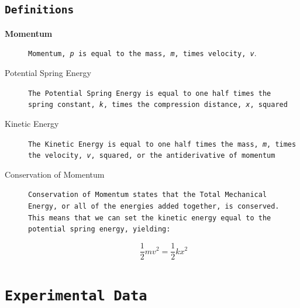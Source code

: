 \documentclass{article}
\begin{document}
\subsection{\texttt{Definitions}}
\label{definitions}
\begin{description}
\item[\textbf{Momentum}]
\texttt{Momentum, \textit{p} is equal to the mass, \textit{m}, times velocity, \textit{v}}.



\item[Potential Spring Energy]
\texttt{The Potential Spring Energy is equal to one half times the spring constant, \textit{k}, times the compression distance, \textit{x}, squared}


\item[Kinetic Energy]
\texttt{The Kinetic Energy is equal to one half times the mass, \textit{m}, times the velocity, \textit{v}, squared, or the antiderivative of momentum}

\item[Conservation of Momentum]
\texttt{Conservation of Momentum states that the Total Mechanical Energy, or all of the energies added together, is conserved. This means that we can set the kinetic energy equal to the potential spring energy, yielding:}



$$ \frac{1}{2} m  v^2  = \frac{1}{2} k x^2 $$


\end{description} 
 

\section{\texttt{Experimental Data}}
\end{document}
